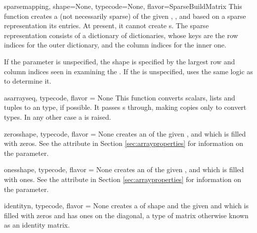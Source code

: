 \begin{funcdesc}{sparse}{mapping, shape=None, typecode=None, flavor=SparseBuildMatrix}
  This function creates a (not necessarily sparse)  of
  the given , , and  based on
  a sparse representation its entries. At present, it cannot create
  s. The sparse representation consists of a dictionary
  of dictionaries, whose keys are the row indices for the outer dictionary,
  and the column indices for the inner one.

  If the  parameter is unspecified, the shape is specified by
  the largest row and column indices seen in examining the .
  If the  is unspecified,  uses the same
  logic as  to determine it.
\end{funcdesc}

\begin{funcdesc}{asarray}{seq, typecode, flavor = None}
  This function converts scalars, lists and tuples to an
   type, if possible. It passes s through,
  making copies only to convert types.  In any other case a
   is raised.
\end{funcdesc}

\begin{funcdesc}{zeros}{shape, typecode, flavor = None}
   creates an  of the given ,
   and  which is filled with zeros. See the
   attribute in Section \ref{sec:arrayproperties} for
  information on the  parameter.
\end{funcdesc}

\begin{funcdesc}{ones}{shape, typecode, flavor = None}
   creates an  of the given ,
   and  which is filled with ones. See the
   attribute in Section \ref{sec:arrayproperties} for
  information on the  parameter.
\end{funcdesc}

\begin{funcdesc}{identity}{n, typecode, flavor = None}
   creates a  of shape  and
  the given  and  which is filled with
  zeros and has ones on the diagonal, a type of matrix otherwise
  known as an identity matrix.
\end{funcdesc}

